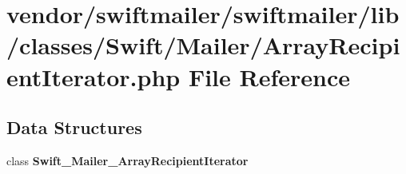 \section{vendor/swiftmailer/swiftmailer/lib/classes/\+Swift/\+Mailer/\+Array\+Recipient\+Iterator.php File Reference}
\label{_array_recipient_iterator_8php}
\subsection*{Data Structures}
\begin{DoxyCompactItemize}
\item 
class {\bf Swift\+\_\+\+Mailer\+\_\+\+Array\+Recipient\+Iterator}
\end{DoxyCompactItemize}
